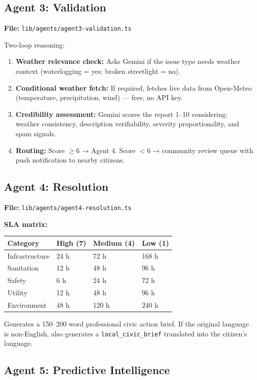 \documentclass[11pt,a4paper]{article}
\newcommand{\thead}[1]{{\color{white}\bfseries\sffamily #1}}
\newcommand{\tech}[1]{\texttt{\color{cpteal}#1}}
\newcommand{\file}[1]{\texttt{\footnotesize\color{cpgray}#1}}
\begin{document}
\subsection{Agent 3: Validation}
\label{sec:agent3}
\textbf{File:} \file{lib/agents/agent3-validation.ts}

Two-loop reasoning:
\begin{enumerate}
  \item \textbf{Weather relevance check:} Asks Gemini if the issue type needs weather context (waterlogging = yes; broken streetlight = no).
  \item \textbf{Conditional weather fetch:} If required, fetches live data from Open-Meteo (temperature, precipitation, wind) — free, no API key.
  \item \textbf{Credibility assessment:} Gemini scores the report 1–10 considering: weather consistency, description verifiability, severity proportionality, and spam signals.
  \item \textbf{Routing:} Score $\geq 6$ → Agent 4. Score $< 6$ → community review queue with push notification to nearby citizens.
\end{enumerate}

\subsection{Agent 4: Resolution}
\label{sec:agent4}
\textbf{File:} \file{lib/agents/agent4-resolution.ts}

\textbf{SLA matrix:}
\begin{tabular}{@{} L{3.2cm} C{2.4cm} C{2.4cm} C{2.4cm} @{}}
\toprule
{}
\thead{Category} & \thead{High (7)} & \thead{Medium (4)} & \thead{Low (1)} \\
\midrule
Infrastructure & 24 h & 72 h & 168 h \\
Sanitation     & 12 h & 48 h & 96 h  \\
Safety         & 6 h  & 24 h & 72 h  \\
Utility        & 12 h & 48 h & 96 h  \\
Environment    & 48 h & 120 h & 240 h \\
\bottomrule
\end{tabular}

Generates a 150–200 word professional civic action brief. If the original language is non-English, also generates a \tech{local\_civic\_brief} translated into the citizen's language.

\subsection{Agent 5: Predictive Intelligence}
\end{document}

